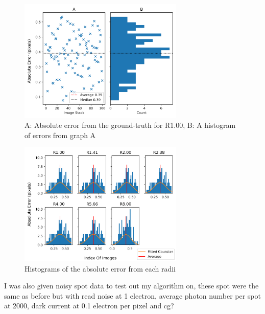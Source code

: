 \documentclass[aps,pra,a4paper,nofootinbib,onecolumn,tightenlines,longbibliography,12pt,amsfonts,amssymb,amsmath,floatfix]{revtex4-2} %
\begin{document}
  
  \begin{figure}[H]
    \begin{center}
      \includegraphics[width=0.7\textwidth]{project_pics/single_histo.png}
    \end{center}
    \caption{A: Absolute error from the ground-truth for R1.00, B: A histogram of errors from graph A}
    \label{fig:single_histo}
  \end{figure}
  

  \begin{figure}[H]
    \begin{center}
      \includegraphics[width=0.7\textwidth]{project_pics/distro.png}
    \end{center}
    \caption{Histograms of the absolute error from each radii}
    \label{fig:distro}
  \end{figure}


I was also given noisy spot data to test out my algorithm on, these spot were the same 
as before but with read noise at 1 electron, average photon number per spot at 2000, 
dark current at 0.1 electron per pixel and cg?
\end{document}
